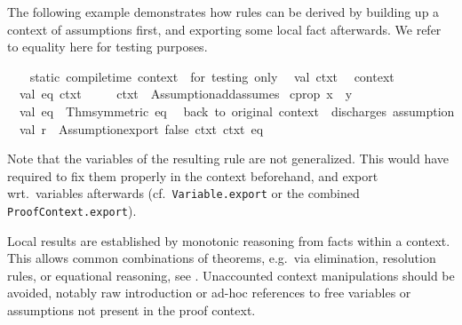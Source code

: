 \begin{isabellebody}
\begin{isamarkuptext}
\begin{description}
  \end{description}%
\end{isamarkuptext}%
\isamarkuptrue%
%
\endisatagmlref
{\isafoldmlref}%
%
\isadelimmlref
%
\endisadelimmlref
%
\isadelimmlex
%
\endisadelimmlex
%
\isatagmlex
%
\begin{isamarkuptext}%
The following example demonstrates how rules can be
  derived by building up a context of assumptions first, and exporting
  some local fact afterwards.  We refer to \hyperlink{theory.Pure}{\mbox{}} equality
  here for testing purposes.%
\end{isamarkuptext}%
\isamarkuptrue%
%
\endisatagmlex
{\isafoldmlex}%
%
\isadelimmlex
%
\endisadelimmlex
%
\isadelimML
%
\endisadelimML
%
\isatagML
{}\isamarkupfalse%
\ {\isacharverbatimopen}\isanewline
\ \ {\isacharparenleft}{\isacharasterisk}static\ compile{\isacharminus}time\ context\ {\isacharminus}{\isacharminus}\ for\ testing\ only{\isacharasterisk}{\isacharparenright}\isanewline
\ \ val\ ctxt{}\ {\isacharequal}\ %
\isaantiq
context%
\endisaantiq
{\isacharsemicolon}\isanewline
\isanewline
\ \ val\ {\isacharparenleft}{\isacharbrackleft}eq{\isacharbrackright}{\isacharcomma}\ ctxt{}{\isacharparenright}\ {\isacharequal}\isanewline
\ \ \ \ ctxt{}\ {\isacharbar}{\isachargreater}\ Assumption{\isachardot}add{\isacharunderscore}assumes\ {\isacharbrackleft}%
\isaantiq
cprop\ {\isachardoublequote}x\ {\isasymequiv}\ y{\isachardoublequote}%
\endisaantiq
{\isacharbrackright}{\isacharsemicolon}\isanewline
\ \ val\ eq{\isacharprime}\ {\isacharequal}\ Thm{\isachardot}symmetric\ eq{\isacharsemicolon}\isanewline
\isanewline
\ \ {\isacharparenleft}{\isacharasterisk}back\ to\ original\ context\ {\isacharminus}{\isacharminus}\ discharges\ assumption{\isacharasterisk}{\isacharparenright}\isanewline
\ \ val\ r\ {\isacharequal}\ Assumption{\isachardot}export\ false\ ctxt{}\ ctxt{}\ eq{\isacharprime}{\isacharsemicolon}\isanewline
{\isacharverbatimclose}%
\endisatagML
{\isafoldML}%
%
\isadelimML
%
\endisadelimML
%
\begin{isamarkuptext}%
Note that the variables of the resulting rule are not
  generalized.  This would have required to fix them properly in the
  context beforehand, and export wrt.\ variables afterwards (cf.\ \verb|Variable.export| or the combined \verb|ProofContext.export|).%
\end{isamarkuptext}%
\isamarkuptrue%
%
\isamarkuptrue%
%
\begin{isamarkuptext}%
Local results are established by monotonic reasoning from facts
  within a context.  This allows common combinations of theorems,
  e.g.\ via \isa{{\isasymAnd}{\isacharslash}{\isasymLongrightarrow}} elimination, resolution rules, or equational
  reasoning, see .  Unaccounted context manipulations
  should be avoided, notably raw \isa{{\isasymAnd}{\isacharslash}{\isasymLongrightarrow}} introduction or ad-hoc
  references to free variables or assumptions not present in the proof
  context.


\end{isamarkuptext}
\end{isabellebody}
